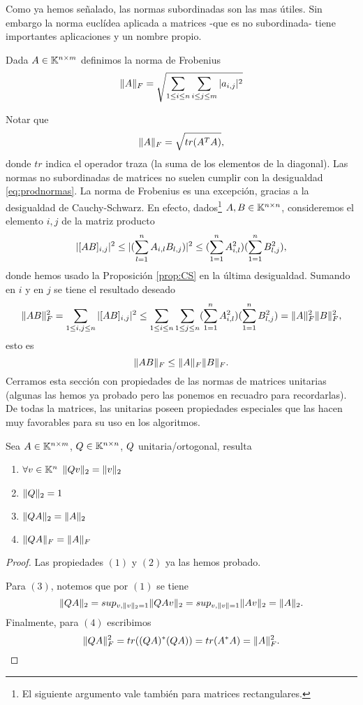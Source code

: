 Como ya hemos señalado, las normas subordinadas son las mas útiles. Sin embargo la norma euclídea aplicada a matrices -que es no subordinada- tiene importantes aplicaciones y un nombre propio.
\tccdefi
\begin{definicion}
 Dada $\Ab\in \K^{n\times m}$ definimos la norma de Frobenius
 $$
 \|\Ab\|_F=\sqrt{\sum_{1\le i\le n}\sum_{i\le j\le m} |a_{i,j}|^2}
 $$
\end{definicion}
\etcc
Notar que
$$
\|\Ab\|_F=\sqrt{tr(\Ab^T\Ab)},
$$
donde $tr$ indica el operador traza (la suma de los elementos de la diagonal). Las normas no subordinadas de matrices no suelen cumplir con la desigualdad \eqref{eq:prodnormas}. La norma de Frobenius es una excepción, gracias a la desigualdad de Cauchy-Schwarz. En efecto, dados\footnote{El siguiente argumento vale también para matrices rectangulares.}
$\Ab,\Bb\in \Knn$, consideremos el elemento $i,j$ de la  matriz producto
$$
|[\Ab\Bb]_{i,j}|^2\le |(\sum_{l=1}^n\Ab_{i,l}\Bb_{l,j})|^2\le (\sum_{1=1}^n\Ab_{i,l}^2)(\sum_{1=1}^n\Bb_{l,j}^2),
$$
donde hemos usado la Proposición \ref{prop:CS} en la última desigualdad. Sumando en $i$ y en $j$ se tiene el resultado deseado
$$
\|\Ab\Bb\|_F^2=\sum_{1\le i,j\le n}|[\Ab\Bb]_{i,j}|^2\le\sum_{1\le i\le n}\sum_{1\le j\le n}(\sum_{1=1}^n\Ab_{i,l}^2)(\sum_{1=1}^n\Bb_{l,j}^2)=
\|\Ab\|_F^2\|\Bb\|_F^2,
$$
esto es
\tcc
$$\|\Ab\Bb\|_F\le \|\Ab\|_F\|\Bb\|_F.$$
\etcc
Cerramos esta sección con propiedades de las normas de matrices unitarias (algunas las hemos ya probado pero las ponemos en recuadro para recordarlas).
De todas la matrices, las unitarias poseen propiedades especiales que las hacen muy favorables para su uso en los algoritmos.
\tcc
\begin{proposicion}
 \label{prop:unitarias}
 Sea $\Ab\in \K^{n\times m}$, $\Qb\in \Knn$, $\Qb$ unitaria/ortogonal, resulta
 \begin{enumerate}
  \item $\forall \vb\in \Kn$
  $\|\Qb\vb\|_{2}=\|\vb\|_2$
  \item $\|\Qb\|_{2}=1$
  \item $\|\Qb\Ab\|_2=\|\Ab\|_2$
  \item $\|\Qb\Ab\|_F=\|\Ab\|_F$
 \end{enumerate}
\end{proposicion}
\etcc
\begin{proof} Las propiedades $(1)$ y $(2)$ ya las hemos probado.

Para $(3)$, notemos que por $(1)$ se tiene
 $$\|\Qb\Ab \|_{2}=sup_{\vb, \|\vb\|_2=1}
 \|\Qb\Ab \vb\|_{2}=sup_{\vb, \|\vb\|=1}\|\Ab\vb\|_2=\|\Ab\|_2.
 $$
 Finalmente, para $(4)$ escribimos
 $$
 \|\Qb\Ab\|_F^2=tr((\Qb\Ab)^*(\Qb\Ab))=tr(\Ab^*\Ab)=\|\Ab\|_F^2.
 $$\end{proof}


